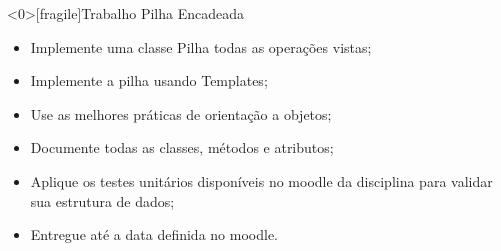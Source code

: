 \documentclass[12pt,table,xcolor={dvipsnames}]{beamer}
\begin{document}
\begin{frame}<0>[fragile]{Trabalho Pilha Encadeada}
\begin{itemize}
\item Implemente uma classe Pilha todas as operações vistas;
\item Implemente a pilha usando Templates;
\item Use as melhores práticas de orientação a objetos;
\item Documente todas as classes, métodos e atributos;
\item Aplique os testes unitários disponíveis no moodle da disciplina para validar sua estrutura de dados;
\item Entregue até a data definida no moodle.
\end{itemize}
\end{frame}

\fi
\end{document}
